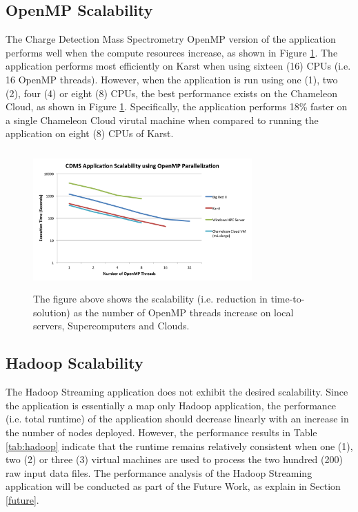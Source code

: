 \documentclass[9pt,twocolumn,twoside]{../../styles/osajnl}
\begin{document}
\subsection{OpenMP Scalability} \label{omp-scalability}
The Charge Detection Mass Spectrometry OpenMP version of the
application performs well when the compute resources increase, as
shown in Figure \ref{fig:scalability2}. The application performs most
efficiently on Karst when using sixteen (16) CPUs (i.e. 16 OpenMP
threads). However, when the application is run using one (1), two (2),
four (4) or eight (8) CPUs, the best performance exists on the
Chameleon Cloud, as shown in Figure
\ref{fig:scalability2}. Specifically, the application performs 18\%
faster on a single Chameleon Cloud virutal machine when compared to
running the application on eight (8) CPUs of Karst. 
\begin{figure}[h]
\centering
\includegraphics[height=2.1in, width=3.3in]{images/scalability2}
\caption{The figure above shows the scalability (i.e. reduction in
  time-to-solution) as the number of OpenMP threads increase on local
  servers, Supercomputers and Clouds.}
\label{fig:scalability2}
\end{figure}

\subsection{Hadoop Scalability} \label{hadoop-scalability}
The Hadoop Streaming application does not exhibit the desired
scalability. Since the application is essentially a map only Hadoop
application, the performance (i.e. total runtime) of the application
should decrease linearly with an increase in the number of nodes
deployed. However, the performance results in Table \ref{tab:hadoop}
indicate that the runtime remains relatively consistent when one (1),
two (2) or three (3) virtual machines are used to process the two
hundred (200) raw input data files. The performance analysis of the
Hadoop Streaming application will be conducted as part of the Future
Work, as explain in Section \ref{future}.
\end{document}
